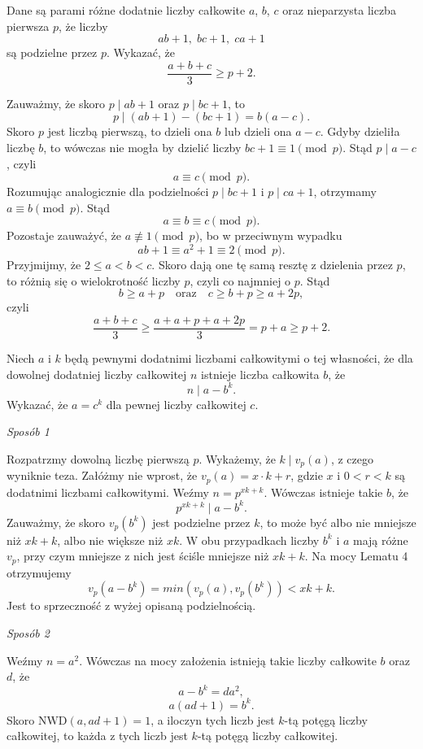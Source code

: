 \begin{problem}{5}
	Dane są parami różne dodatnie liczby całkowite $a$, $b$, $c$ oraz nieparzysta liczba pierwsza $p$, że liczby
	\[
		ab + 1, \; bc + 1, \; ca + 1
	\] 
	są podzielne przez $p$. Wykazać, że
	\[
		\frac{a + b + c}{3} \geqslant p + 2.
	\]
\end{problem}

\noindent
Zauważmy, że skoro $p \mid ab + 1$ oraz $p \mid bc + 1$, to
\[
	p \mid (ab + 1) - (bc + 1) = b(a - c).
\]
Skoro $p$ jest liczbą pierwszą, to dzieli ona $b$ lub dzieli ona $a - c$. Gdyby dzieliła liczbę $b$, to wówczas nie mogła by dzielić liczby $bc + 1 \equiv 1 \pmod{p}$. Stąd $p \mid a - c$, czyli 
\[
	a \equiv c \pmod{p}.
\] 
Rozumując analogicznie dla podzielności $p \mid bc + 1$ i $p \mid ca + 1$, otrzymamy $a \equiv b \pmod{p}$. Stąd
\[
	a \equiv b \equiv c \pmod{p}.
\]
Pozostaje zauważyć, że $a \not\equiv 1 \pmod{p}$, bo w przeciwnym wypadku 
\[
	ab + 1 \equiv a^2 + 1 \equiv 2 \pmod{p}.
\]
Przyjmijmy, że $2 \leqslant a < b < c$. Skoro dają one tę samą resztę z dzielenia przez $p$, to różnią się o wielokrotność liczby $p$, czyli co najmniej o $p$. Stąd
\[
	b \geqslant a + p \quad \text{oraz} \quad c \geqslant b + p \geqslant a + 2p,
\]
czyli
\[
	\frac{a + b + c}{3} \geqslant \frac{a + a + p + a + 2p}{3} = p + a \geqslant p + 2.
\]

\begin{problem}{6}
	Niech $a$ i $k$ będą pewnymi dodatnimi liczbami całkowitymi o tej własności, że dla dowolnej dodatniej liczby całkowitej $n$ istnieje liczba całkowita $b$, że
	\[
		n \mid a - b^k.
	\]
	Wykazać, że $a = c^k$ dla pewnej liczby całkowitej $c$.
\end{problem}

\noindent
\textit{Sposób 1}

\vspace{10px}

\noindent
Rozpatrzmy dowolną liczbę pierwszą $p$. Wykażemy, że $k \mid v_p(a)$, z czego wyniknie teza. Załóżmy nie wprost, że $v_p(a) = x \cdot k + r$, gdzie $x$ i $0 < r < k$ są dodatnimi liczbami całkowitymi. Weźmy $n = p^{xk + k}$. Wówczas istnieje takie $b$, że
\[
	p^{xk + k} \mid a - b^k.
\]
Zauważmy, że skoro $v_p(b^k)$ jest podzielne przez $k$, to może być albo nie mniejsze niż $xk + k$, albo nie większe niż $xk$. W obu przypadkach liczby $b^k$ i $a$ mają różne $v_p$, przy czym mniejsze z nich jest ściśle mniejsze niż $xk + k$. Na mocy Lematu 4 otrzymujemy 
\[
	v_p(a - b^k) = min(v_p(a), v_p(b^k)) < xk + k.
\]
Jest to sprzeczność z wyżej opisaną podzielnością.

\vspace{10px}

\noindent
\textit{Sposób 2}

\vspace{10px}

\noindent
Weźmy $n = a^2$. Wówczas na mocy założenia istnieją takie liczby całkowite $b$ oraz $d$, że
\[
	a - b^k = da^2,
\]
\[
	a(ad + 1) = b^k.
\]
Skoro $\mathrm{NWD}(a, ad + 1) = 1$, a iloczyn tych liczb jest $k$-tą potęgą liczby całkowitej, to każda z tych liczb jest $k$-tą potęgą liczby całkowitej.

\vspace{10px}


